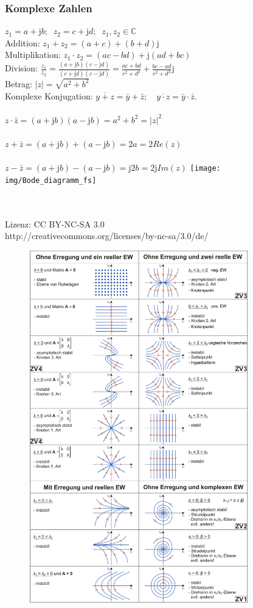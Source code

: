 \documentclass[a4paper,twocolumn,10pt]{article}
\begin{document}
\subsubsection*{Komplexe Zahlen}
$z_1 = a+\mathrm{j}b;\;\; z_2 = c+\mathrm{j}d;\;\; z_1, z_2 \in \mathbb{C}$\\
Addition: $ z_{1}+z_{2}=(a+c)+(b+d)\mathrm{j}$\\
Multiplikation: $ z_{1} \cdot z_{2} = (ac-bd)+\mathrm{j}(ad+bc)$ \\
Division: $\frac{z_1}{z_2}= \frac{(a+\mathrm{j}b)(c-\mathrm{j}d)}{(c+\mathrm{j}d)(c-\mathrm{j}d)} = \frac{ac+bd}{c^{2}+d^{2}}+ \frac {bc-ad}{c^{2}+d^{2}}\mathrm{j}$\\
Betrag: $|z| = \sqrt{a^2 + b^2}$\\
Komplexe Konjugation: $\overline{y+z}=\bar y+\bar z; \quad \overline{y\cdot z}=\bar y\cdot \bar z.$\\\\
${z\cdot {\bar {z}}=(a+\mathrm{j}b)(a-\mathrm{j}b)=a^{2}+b^{2}=|z|^{2}}$\\\\
${z+{\bar {z}}=(a+\mathrm{j}b)+(a-\mathrm{j}b)=2a=2Re(z)}$\\\\
${z-{\bar {z}}=(a+\mathrm{j}b)-(a-\mathrm{j}b)=\mathrm{j}2b=2\mathrm{j}Im(z)}$
\texttt{[image: img/Bode\_diagramm\_fs]}

\\\\
Lizenz: CC BY-NC-SA 3.0\\
http://creativecommons.org/licenses/by-nc-sa/3.0/de/
\newpage
\begin{figure}
\begin{center}
\includegraphics[width=0.85\textwidth]{img/Phasenportraits-annotated}
\end{center}
\end{figure}
\end{document}
